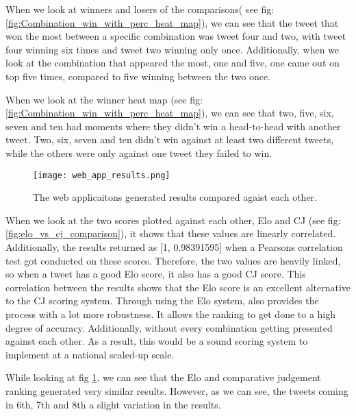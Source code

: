 	When we look at winners and losers of the comparisons( see fig: \ref{fig:Combination_win_with_perc_heat_map}), we can see that the tweet that won the most between a specific combination was tweet four and two, with tweet four winning six times and tweet two winning only once. Additionally, when we look at the combination that appeared the most, one and five, one came out on top five times, compared to five winning between the two once.
	
	When we look at the winner heat map (see fig: \ref{fig:Combination_win_with_perc_heat_map}), we can see that two, five, six, seven and ten had moments where they didn't win a head-to-head with another tweet. Two, six, seven and ten didn't win against at least two different tweets, while the others were only against one tweet they failed to win.
	
		
	
\begin{figure}[t]
	\centering
	\texttt{[image: web\_app\_results.png]}
	\caption{The web applicaitons generated results compared agaist each other.}
	\label{fig:web_app_results}
	
\end{figure}
	

	When we look at the two scores plotted against each other, Elo and CJ (see fig: \ref{fig:elo_vs_cj_comparison}), it shows that these values are linearly correlated. Additionally, the results returned as [1, 0.98391595] when a Pearsons correlation test got conducted on these scores. Therefore, the two values are heavily linked, so when a tweet has a good Elo score, it also has a good CJ score. This correlation between the results shows that the Elo score is an excellent alternative to the CJ scoring system. Through using the Elo system, also provides the process with a lot more robustness. It allows the ranking to get done to a high degree of accuracy. Additionally, without every combination getting presented against each other. As a result, this would be a sound scoring system to implement at a national scaled-up scale.

		
	
	While looking at fig \ref{fig:web_app_results}, we can see that the Elo and comparative judgement ranking generated very similar results. However, as we can see, the tweets coming in 6th, 7th and 8th a slight variation in the results.
	
